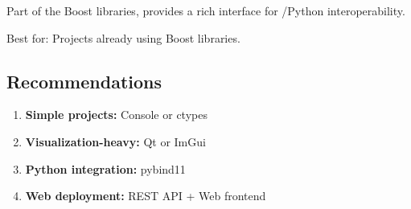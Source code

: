 Part of the Boost libraries, provides a rich interface for \cpp{}/Python interoperability.

Best for: Projects already using Boost libraries.

\subsection{Recommendations}

\begin{enumerate}
  \item \textbf{Simple projects:} \cpp{} Console or ctypes
  \item \textbf{Visualization-heavy:} Qt or ImGui
  \item \textbf{Python integration:} pybind11
  \item \textbf{Web deployment:} REST API + Web frontend
\end{enumerate}
